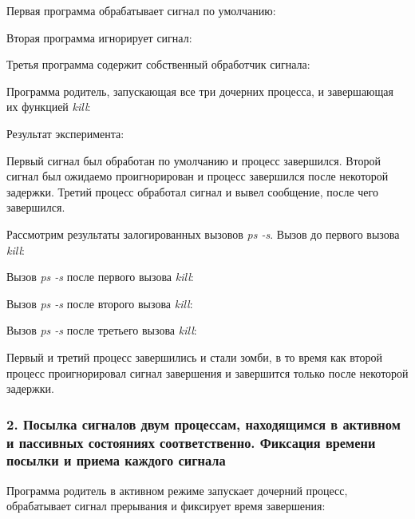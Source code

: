 \documentclass[14pt,a4paper,report]{report}
\begin{document}
Первая программа обрабатывает сигнал по умолчанию:



Вторая программа игнорирует сигнал:



Третья программа содержит собственный обработчик сигнала:



Программа родитель, запускающая все три дочерних процесса, и завершающая их функцией \emph{kill}:



Результат эксперимента:



Первый сигнал был обработан по умолчанию и процесс завершился. Второй сигнал был ожидаемо проигнорирован и процесс завершился после некоторой задержки. Третий процесс обработал сигнал и вывел сообщение, после чего завершился.

Рассмотрим результаты залогированных вызовов \emph{ps -s}. Вызов до первого вызова \emph{kill}:



Вызов \emph{ps -s} после первого вызова \emph{kill}:



Вызов \emph{ps -s} после второго вызова \emph{kill}:



Вызов \emph{ps -s} после третьего вызова \emph{kill}:



Первый и третий процесс завершились и стали зомби, в то время как второй процесс проигнорировал сигнал завершения и завершится только после некоторой задержки.

\subsubsection{2. Посылка сигналов двум процессам, находящимся в активном и пассивных состояниях соответственно. Фиксация времени посылки и приема каждого сигнала}

Программа родитель в активном режиме запускает дочерний процесс, обрабатывает сигнал прерывания и  фиксирует время завершения:
\end{document}
